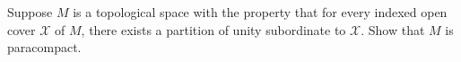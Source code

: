 Suppose $M$ is a topological space with the property that for every indexed open cover $\mathcal{X}$ of $M$, there exists a partition of unity subordinate to $\mathcal{X}$.  Show that $M$ is paracompact.